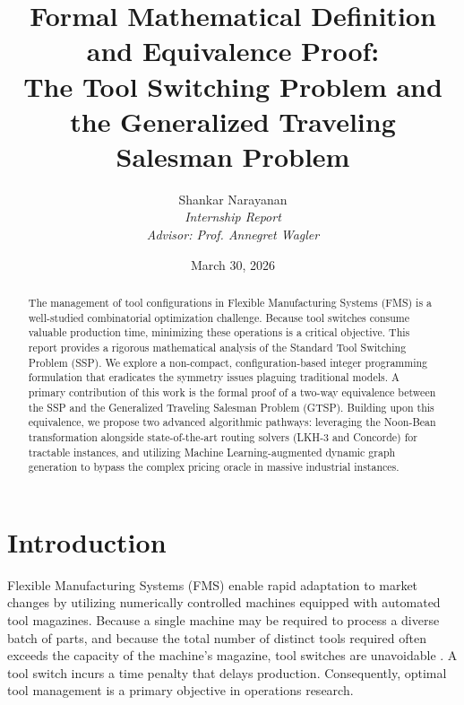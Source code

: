\documentclass[12pt]{article}
\begin{document}
	
	\title{\textbf{Formal Mathematical Definition and Equivalence Proof: \\ The Tool Switching Problem and the Generalized Traveling Salesman Problem}}
	\author{Shankar Narayanan \\ \textit{Internship Report} \\ \textit{Advisor: Prof. Annegret Wagler}}
	\date{March 30, 2026}
	
	\maketitle
	
	\begin{abstract}
		The management of tool configurations in Flexible Manufacturing Systems (FMS) is a well-studied combinatorial optimization challenge. Because tool switches consume valuable production time, minimizing these operations is a critical objective. This report provides a rigorous mathematical analysis of the Standard Tool Switching Problem (SSP). We explore a non-compact, configuration-based integer programming formulation that eradicates the symmetry issues plaguing traditional models. A primary contribution of this work is the formal proof of a two-way equivalence between the SSP and the Generalized Traveling Salesman Problem (GTSP). Building upon this equivalence, we propose two advanced algorithmic pathways: leveraging the Noon-Bean transformation alongside state-of-the-art routing solvers (LKH-3 and Concorde) for tractable instances, and utilizing Machine Learning-augmented dynamic graph generation to bypass the complex pricing oracle in massive industrial instances.
	\end{abstract}
	
	\newpage
	
	\section{Introduction}
	
	Flexible Manufacturing Systems (FMS) enable rapid adaptation to market changes by utilizing numerically controlled machines equipped with automated tool magazines. Because a single machine may be required to process a diverse batch of parts, and because the total number of distinct tools required often exceeds the capacity of the machine's magazine, tool switches are unavoidable \parencite{Tang1988}. A tool switch incurs a time penalty that delays production. Consequently, optimal tool management is a primary objective in operations research.
	
\end{document}
